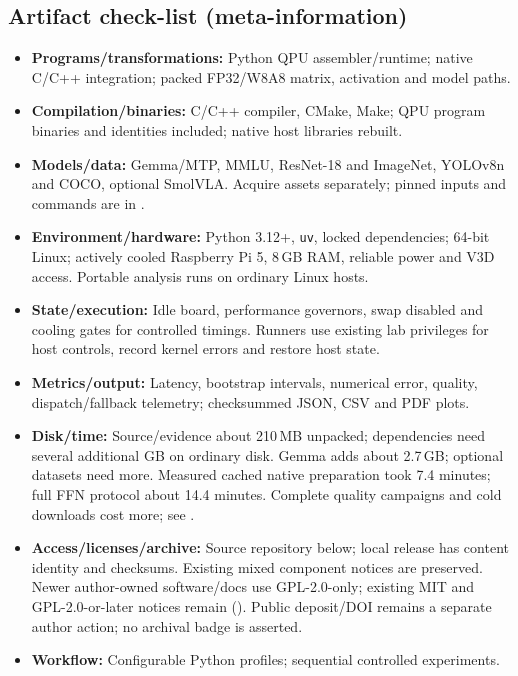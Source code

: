 \subsection{Artifact check-list (meta-information)}
\begin{itemize}
\item \textbf{Programs/transformations:} Python QPU assembler/runtime;
native C/C++ integration; packed FP32/W8A8 matrix, activation and model paths.
\item \textbf{Compilation/binaries:} C/C++ compiler, CMake, Make;
QPU program binaries and identities included; native host libraries rebuilt.
\item \textbf{Models/data:} Gemma/MTP, MMLU, ResNet-18 and ImageNet,
YOLOv8n and COCO, optional SmolVLA. Acquire assets separately;
pinned inputs and commands are in .
\item \textbf{Environment/hardware:} Python 3.12+, \texttt{uv}, locked
dependencies; 64-bit Linux; actively cooled Raspberry Pi 5, 8\,GB RAM,
reliable power and V3D access. Portable analysis runs on ordinary Linux hosts.
\item \textbf{State/execution:} Idle board, performance governors, swap
disabled and cooling gates for controlled timings. Runners use existing lab
privileges for host controls, record kernel errors and restore host state.
\item \textbf{Metrics/output:} Latency, bootstrap intervals, numerical error,
quality, dispatch/fallback telemetry; checksummed JSON, CSV and PDF plots.
\item \textbf{Disk/time:} Source/evidence about 210\,MB unpacked; dependencies
need several additional GB on ordinary disk. Gemma adds about 2.7\,GB;
optional datasets need more. Measured cached native preparation took
7.4 minutes; full FFN protocol about 14.4 minutes. Complete quality
campaigns and cold downloads cost more; see .
\item \textbf{Access/licenses/archive:} Source repository below; local
release has content identity and checksums. Existing mixed component notices
are preserved. Newer author-owned software/docs use GPL-2.0-only; existing
MIT and GPL-2.0-or-later notices remain (). Public deposit/DOI remains
a separate author action; no archival badge is asserted.
\item \textbf{Workflow:} Configurable Python profiles; sequential controlled
experiments.
\end{itemize}

